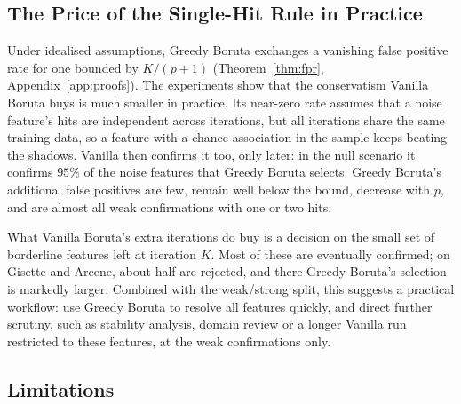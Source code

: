 \documentclass[runningheads]{llncs}
\begin{document}
\subsection{The Price of the Single-Hit Rule in Practice}
\label{sec:discussion:tradeoff}

Under idealised assumptions, Greedy Boruta exchanges a vanishing false positive rate for one bounded by $K/(p+1)$ (Theorem~\ref{thm:fpr}, Appendix~\ref{app:proofs}). The experiments show that the conservatism Vanilla Boruta buys is much smaller in practice. Its near-zero rate assumes that a noise feature's hits are independent across iterations, but all iterations share the same training data, so a feature with a chance association in the sample keeps beating the shadows. Vanilla then confirms it too, only later: in the null scenario it confirms $95\%$ of the noise features that Greedy Boruta selects. Greedy Boruta's additional false positives are few, remain well below the bound, decrease with $p$, and are almost all weak confirmations with one or two hits.

What Vanilla Boruta's extra iterations do buy is a decision on the small set of borderline features left at iteration $K$. Most of these are eventually confirmed; on Gisette and Arcene, about half are rejected, and there Greedy Boruta's selection is markedly larger. Combined with the weak/strong split, this suggests a practical workflow: use Greedy Boruta to resolve all features quickly, and direct further scrutiny, such as stability analysis, domain review or a longer Vanilla run restricted to these features, at the weak confirmations only.

\subsection{Limitations}
\label{sec:discussion:limitations}
\end{document}
